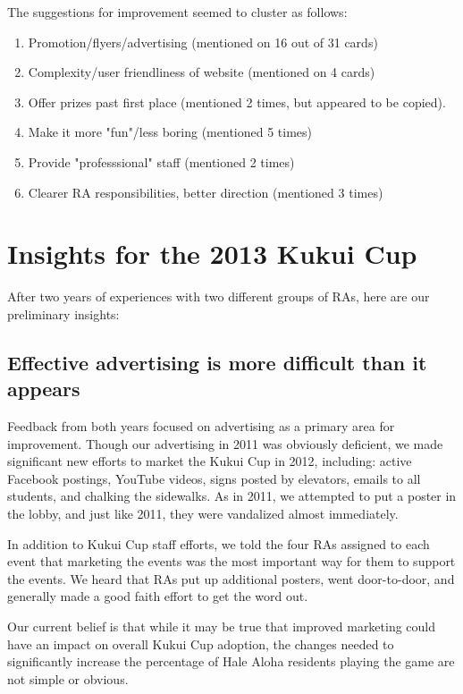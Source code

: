 \documentclass[]{article}
\begin{document}
The suggestions for improvement seemed to cluster as follows:

\begin{enumerate}[noitemsep]
\item Promotion/flyers/advertising (mentioned on 16 out of 31 cards)
\item Complexity/user friendliness of website (mentioned on 4 cards)
\item Offer prizes past first place (mentioned 2 times, but appeared to be copied).
\item Make it more "fun"/less boring (mentioned 5 times)
\item Provide "professsional" staff (mentioned 2 times)
\item Clearer RA responsibilities, better direction (mentioned 3 times)
\end{enumerate}


\section{Insights for the 2013 Kukui Cup}
\label{kc-2013}

After two years of experiences with two different groups of RAs, here are our preliminary
insights:

\subsection{Effective advertising is more difficult than it appears}

Feedback from both years focused on advertising as a primary area for improvement.  Though
our advertising in 2011 was obviously deficient, we made significant new efforts to market the
Kukui Cup in 2012, including: active Facebook postings, YouTube videos, signs posted by
elevators, emails to all students, and chalking the sidewalks.  As in 2011, we attempted
to put a poster in the lobby, and just like 2011, they were vandalized almost
immediately.  

In addition to Kukui Cup staff efforts, we told the four RAs assigned to each
event that marketing the events was the most important way for them to support the
events.  We heard that RAs put up additional posters, went door-to-door, and generally
made a good faith effort to get the word out. 

Our current belief is that while it may be true that improved marketing could have an
impact on overall Kukui Cup adoption, the changes needed to significantly increase
the percentage of Hale Aloha residents playing the game are not simple or obvious.    
\end{document}
